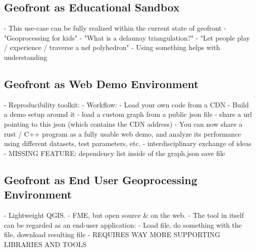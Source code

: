 








\subsection{Geofront as Educational Sandbox}
- This use-case can be fully realized within the current state of geofront
- "Geoprocessing for kids"
- "What is a delaunay triangulation?" 
- "Let people play / experience / traverse a nef polyhedron"
- Using something helps with understanding

\subsection{Geofront as Web Demo Environment}
- Reproducibility toolkit:
- Workflow: 
  - Load your own code from a CDN
  - Build a demo setup around it
  - load a custom graph from a public json file
  - share a url pointing to this json (which contains the CDN address)
- You can now share a rust / C++ program as a fully usable web demo,   
  and analyze its performance using different datasets, test parameters, etc. 
- interdisciplinary exchange of ideas
- MISSING FEATURE: dependency list inside of the graph.json save file

\subsection{Geofront as End User Geoprocessing Environment}
- Lightweight QGIS.
- FME, but open source \& on the web.
- The tool in itself can be regarded as an end-user application:
  - Load file, do something with the file, download resulting file
  - REQUIRES WAY MORE SUPPORTING LIBRARIES AND TOOLS



